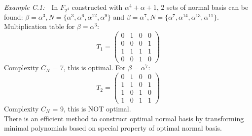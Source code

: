\textit{Example C.1:}\ \ In $F_{2^4}$ constructed with $\alpha^4 + \alpha + 1$, 2 sets of normal basis can be found:
$\beta = \alpha^3, N = \{ \alpha^3, \alpha^6, \alpha^{12}, \alpha^9\}$ and 
$\beta = \alpha^7, N = \{\alpha^7, \alpha^{14}, \alpha^{13}, \alpha^{11}\}$. Multiplication table for $\beta = \alpha^3$:
\begin{equation}
T_1 = \left(
\begin{array}{lccr}
0 & 1 & 0 & 0\\
0 & 0 & 0 & 1\\
1 & 1 & 1 & 1\\
0 & 0 & 1 & 0
\end{array} \right)
\end{equation}
Complexity $C_N$ = 7, this is optimal. For $\beta = \alpha^7$:
\begin{equation}
T_2 = \left(
\begin{array}{lccr}
0 & 1 & 0 & 0\\
1 & 1 & 0 & 1\\
1 & 0 & 1 & 0\\
1 & 0 & 1 & 1
\end{array} \right)
\end{equation}
Complexity $C_N$ = 9, this is NOT optimal.\\

There is an efficient method to construct optimal normal basis by transforming minimal polynomials based on
special property of optimal normal basis\cite{ECC}.


